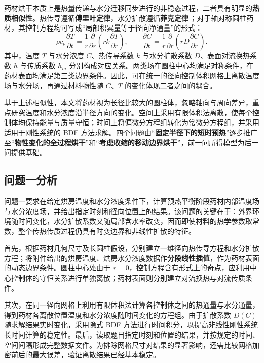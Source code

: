 \documentclass[12pt,a4paper,fontset=none]{ctexart}
\begin{document}
药材烘干本质上是热量传递与水分迁移同步进行的非稳态过程，二者具有明显的\textbf{热质相似性}。热传导遵循\textbf{傅里叶定律}，水分扩散遵循\textbf{菲克定律}\,\cite{crank}；对于轴对称圆柱药材，其控制方程均可写成“局部积累量等于径向净通量”的形式：
\begin{equation}
 \rho c_p\frac{\partial T}{\partial t}
 =\frac{1}{r}\frac{\partial}{\partial r}
 \left(rk\frac{\partial T}{\partial r}\right),\qquad
 \frac{\partial C}{\partial t}
 =\frac{1}{r}\frac{\partial}{\partial r}
 \left(rD\frac{\partial C}{\partial r}\right).
\end{equation}
其中，温度 $T$ 与水分浓度 $C$、热传导系数 $k$ 与水分扩散系数 $D$、表面对流换热系数 $h$ 与传质系数 $h_m$ 分别构成对应关系。两类场在圆柱中心均满足对称条件，在药材表面均满足第三类边界条件。因此，可在统一的径向控制体积网格上离散温度场与水分场，再通过材料物性随 $C$、$T$ 的变化体现二者之间的耦合。

基于上述相似性，本文将药材视为长径比较大的圆柱体，忽略轴向与周向差异，重点研究温度和水分浓度沿半径方向的变化。空间上采用有限体积法离散，使每个控制体均保持能量与质量守恒；时间上将偏微分方程组转化为常微分方程组，并采用适用于刚性系统的 BDF 方法求解。四个问题由“\textbf{固定半径下的短时预热}”逐步推广至“\textbf{物性变化的全过程烘干}”和“\textbf{考虑收缩的移动边界烘干}”，前一问所得模型为后一问提供基础。

\subsection{问题一分析}

问题一要求在给定烘房温度和水分浓度条件下，计算预热平衡阶段药材内部温度场与水分浓度场，并给出指定时刻和径向位置上的结果。该问题的关键在于：外界环境随时间变化，水分扩散系数又随局部含水率改变，因而即使材料的热学参数取常数，整个传热传质过程仍具有时变边界和非线性扩散的特征。

首先，根据药材几何尺寸及长圆柱假设，分别建立一维径向热传导方程和水分扩散方程；将附件给出的烘房温度、烘房水分浓度数据作\textbf{分段线性插值}，作为药材表面的动态边界条件。圆柱中心处由于 $r=0$，控制方程含有形式上的奇点，应利用中心控制体的守恒关系进行单独离散；药材表面则分别建立对流换热与对流传质条件。

其次，在同一径向网格上利用有限体积法计算各控制体之间的热通量与水分通量，得到药材各离散位置温度和水分浓度随时间变化的方程组。由于扩散系数 $D(C)$ 随求解结果实时变化，采用隐式 BDF 方法进行时间积分，以提高非线性刚性系统长时间计算的稳定性。最后，读取题目指定时刻和位置的结果，并按规定的时间、空间间隔形成完整数据文件。为排除网格尺寸对结果的显著影响，还需比较网格加密前后的最大误差，验证离散结果已经基本稳定。
\end{document}
